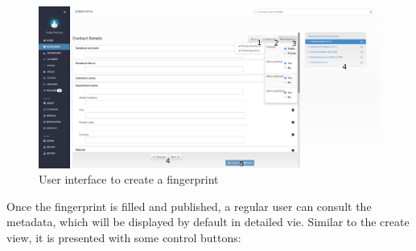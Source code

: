\begin{figure}[h]
    \center
    \includegraphics[width=\textwidth]{fingerprint-new}
    \caption{User interface to create a fingerprint}
    \label{fig:fingerprint-new}
\end{figure}

Once the fingerprint is filled and published, a regular user can consult the metadata, which will be displayed by default in detailed vie. Similar to the create view, it is presented with some control buttons:

